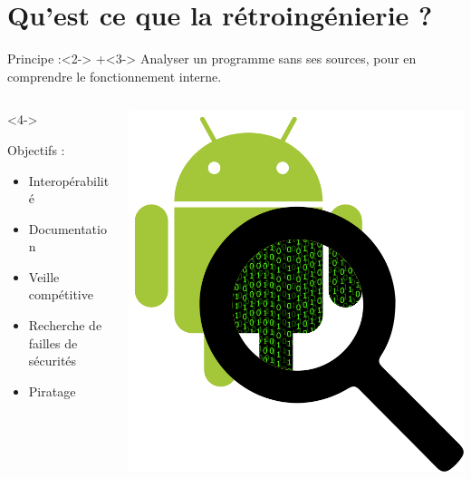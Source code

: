 \documentclass[11pt,aspectratio=1610]{beamer}%
\begin{document}
\section{Qu'est ce que la rétroingénierie ?}
  \begin{frame}[t]
      \slidetitle[]
      \begin{block}{Principe :}<2->
        \onslide+<3->{
        Analyser un programme sans ses sources, pour en comprendre le fonctionnement interne.
        }
      \end{block}
      \vfill
      \begin{columns}
        \begin{column}{.7\linewidth}<4->
          \begin{block}{Objectifs :}
            \begin{itemize}
            \item<5-> Interopérabilité
            \item<6-> Documentation
            \item<7-> Veille compétitive
            \item<8-> Recherche de failles de sécurités
            \item<9-> Piratage
            \end{itemize}
          \end{block}
        \end{column}
        \begin{column}{.25\linewidth}
          \centering
          \includegraphics[width=\linewidth]{img/android_loupe.png}
        \end{column}
      \end{columns}
      \vfill
  \end{frame}
\end{document}
